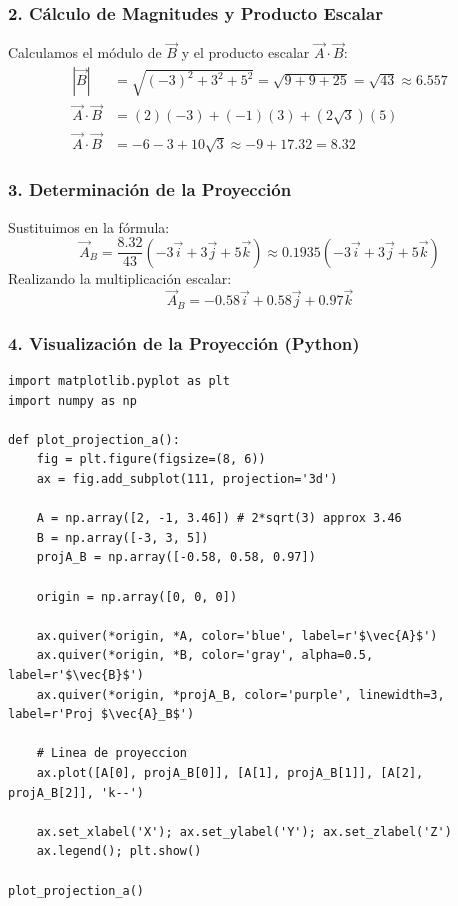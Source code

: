 \documentclass[12pt, a4paper]{article}
\begin{document}
\subsubsection*{2. Cálculo de Magnitudes y Producto Escalar}
Calculamos el módulo de $\vec{B}$ y el producto escalar $\vec{A} \cdot \vec{B}$:
\begin{align*}
    |\vec{B}| &= \sqrt{(-3)^2 + 3^2 + 5^2} = \sqrt{9 + 9 + 25} = \sqrt{43} \approx 6.557 \\
    \vec{A} \cdot \vec{B} &= (2)(-3) + (-1)(3) + (2\sqrt{3})(5) \\
    \vec{A} \cdot \vec{B} &= -6 - 3 + 10\sqrt{3} \approx -9 + 17.32 = 8.32
\end{align*}

\subsubsection*{3. Determinación de la Proyección}
Sustituimos en la fórmula:
\begin{equation*}
    \vec{A}_B = \frac{8.32}{43} (-3\vec{i} + 3\vec{j} + 5\vec{k}) \approx 0.1935 (-3\vec{i} + 3\vec{j} + 5\vec{k})
\end{equation*}
Realizando la multiplicación escalar:
\begin{equation*}
    \vec{A}_B = -0.58\vec{i} + 0.58\vec{j} + 0.97\vec{k}
\end{equation*}

\subsubsection*{4. Visualización de la Proyección (Python)}
\begin{lstlisting}
import matplotlib.pyplot as plt
import numpy as np

def plot_projection_a():
    fig = plt.figure(figsize=(8, 6))
    ax = fig.add_subplot(111, projection='3d')
    
    A = np.array([2, -1, 3.46]) # 2*sqrt(3) approx 3.46
    B = np.array([-3, 3, 5])
    projA_B = np.array([-0.58, 0.58, 0.97])
    
    origin = np.array([0, 0, 0])
    
    ax.quiver(*origin, *A, color='blue', label=r'$\vec{A}$')
    ax.quiver(*origin, *B, color='gray', alpha=0.5, label=r'$\vec{B}$')
    ax.quiver(*origin, *projA_B, color='purple', linewidth=3, label=r'Proj $\vec{A}_B$')
    
    # Linea de proyeccion
    ax.plot([A[0], projA_B[0]], [A[1], projA_B[1]], [A[2], projA_B[2]], 'k--')
    
    ax.set_xlabel('X'); ax.set_ylabel('Y'); ax.set_zlabel('Z')
    ax.legend(); plt.show()

plot_projection_a()
\end{lstlisting}
\end{document}
